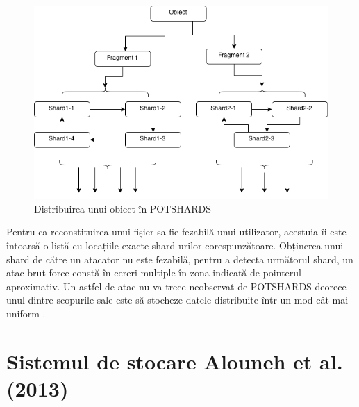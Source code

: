 \documentclass[oneside, 12pt]{book}
\begin{document}
\begin{figure}
	\begin{center}
	\includegraphics[width=12cm]{img/POTSHARDS.png}    %
	\caption{Distribuirea unui obiect în POTSHARDS}
	\label{fig:potshards-layers}
	\bigskip
	\end{center}
\end{figure}

Pentru ca reconstituirea unui fișier sa fie fezabilă unui utilizator, acestuia îi este întoarsă o listă cu locațiile exacte shard-urilor corespunzătoare.
Obținerea unui shard de către un atacator nu este fezabilă, pentru a detecta următorul shard, un atac brut force constă în cereri multiple în zona indicată de pointerul aproximativ. Un astfel de atac nu va trece neobservat de POTSHARDS deorece unul dintre scopurile sale este să stocheze datele distribuite într-un mod cât mai uniform \cite{SGMV:2009}.



\section{Sistemul de stocare Alouneh et al. (2013)}
\label{sec:desc_alouneh}
\end{document}
